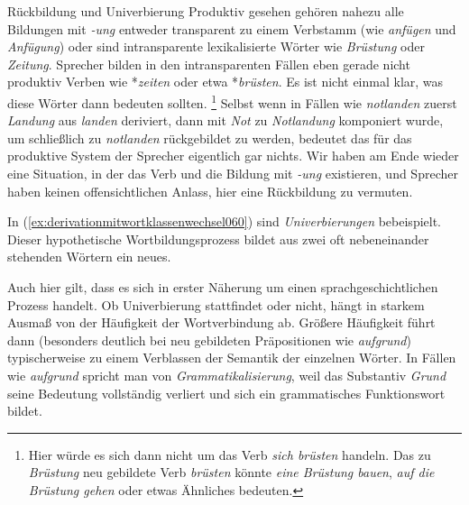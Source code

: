 \begin{Vertiefung}{Rückbildung und Univerbierung}
Produktiv gesehen gehören \zB nahezu alle Bildungen mit \textit{-ung} entweder transparent zu einem Verbstamm (wie \textit{anfügen} und \textit{Anfügung}) oder sind intransparente lexikalisierte Wörter wie \textit{Brüstung} oder \textit{Zeitung}.
Sprecher bilden in den intransparenten Fällen eben gerade nicht produktiv Verben wie *\textit{zeiten} oder etwa *\textit{brüsten}.
Es ist nicht einmal klar, was diese Wörter dann bedeuten sollten.%
\footnote{Hier würde es sich dann nicht um das Verb \textit{sich brüsten} handeln.
Das zu \textit{Brüstung} neu gebildete Verb \textit{brüsten} könnte \zB \textit{eine Brüstung bauen}, \textit{auf die Brüstung gehen} oder etwas Ähnliches bedeuten.}
Selbst wenn in Fällen wie \textit{notlanden} zuerst \textit{Landung} aus \textit{landen} deriviert, dann mit \textit{Not} zu \textit{Notlandung} komponiert wurde, um schließlich zu \textit{notlanden} rückgebildet zu werden, bedeutet das für das produktive System der Sprecher eigentlich gar nichts.
Wir haben am Ende wieder eine Situation, in der das Verb und die Bildung mit \textit{-ung} existieren, und Sprecher haben keinen offensichtlichen Anlass, hier eine Rückbildung zu vermuten.

In (\ref{ex:derivationmitwortklassenwechsel060}) sind \textit{Univerbierungen} bebeispielt.
Dieser hypothetische Wortbildungsprozess bildet aus zwei oft nebeneinander stehenden Wörtern ein neues.

\begin{exe}
  \ex\label{ex:derivationmitwortklassenwechsel060}
  \begin{xlist}
  \end{xlist}
\end{exe}

Auch hier gilt, dass es sich in erster Näherung um einen sprachgeschichtlichen Prozess handelt.
Ob Univerbierung stattfindet oder nicht, hängt in starkem Ausmaß von der Häufigkeit der Wortverbindung ab.
Größere Häufigkeit führt dann (besonders deutlich \zB bei neu gebildeten Präpositionen wie \textit{aufgrund}) typischerweise zu einem Verblassen der Semantik der einzelnen Wörter.
In Fällen wie \textit{aufgrund} spricht man von \textit{Grammatikalisierung}, weil das Substantiv \textit{Grund} seine Bedeutung vollständig verliert und sich ein grammatisches Funktionswort bildet.


\end{Vertiefung}
